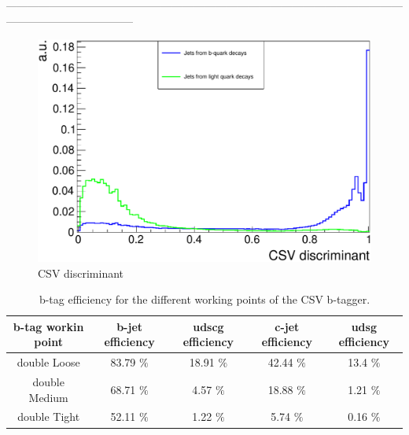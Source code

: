 -----------------------------------------------------------------------------------------------------------------------------------------------
\\


\begin{figure}[h!t]
 \centering
 \includegraphics[width = 0.85 \textwidth]{Chapters/Chapter4_EvtSel/Figures/CSVDiscr_LightAndBJets.pdf}
 \caption{CSV discriminant} \label{fig::CSVDiscr}
\end{figure}

\begin{table}[h!t]
 \centering
 \caption{b-tag efficiency for the different working points of the CSV b-tagger.}
 \begin{tabular}{c|c|c|c|c}
  b-tag workin point 	& b-jet efficiency 	& udscg efficiency 	& c-jet efficiency 	& udsg efficiency 	\\
  \hline
  double Loose 		& 83.79 $\%$		& 18.91 $\%$		& 42.44 $\%$ 		& 13.4 $\%$		\\
  double Medium 	& 68.71 $\%$		& 4.57 $\%$		& 18.88 $\%$		& 1.21 $\%$		\\
  double Tight 		& 52.11 $\%$ 		& 1.22 $\%$ 		& 5.74 $\%$ 		& 0.16 $\%$ 		\\
 \end{tabular}
\end{table}


